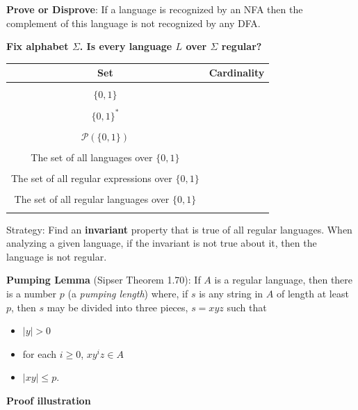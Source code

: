 \documentclass[12pt, oneside]{article}
\begin{document}
\vfill

{\bf Prove or Disprove}: If a language is recognized by an NFA 
then the complement of this language is not recognized by any DFA.

\vfill

\newpage

{\bf Fix alphabet $\Sigma$. Is every language $L$ over $\Sigma$ regular?}

\begin{center}
\begin{tabular}{c|c}
Set & Cardinality \\
\hline
& \\
$\{0,1\}$ & \\
& \\
$\{0,1\}^*$ & \\
& \\
$\mathcal{P}( \{0,1\})$ & \\
& \\
The set of all languages over $\{0,1\}$ & \\
& \\
The set of all regular expressions over $\{0,1\}$ & \\
& \\
The set of all regular languages over $\{0,1\}$ & \\
& \\
\end{tabular}
\end{center}



\vfill
Strategy: Find an {\bf invariant} property that is true of all regular languages. When analyzing 
a given language, if the invariant is not true about it, then the language is not regular.
\newpage

{\bf Pumping Lemma} (Sipser Theorem 1.70): If $A$ is a regular language, then there
is a number $p$ (a {\it pumping length}) where, if $s$ is any string in $A$ of length at least $p$, 
then $s$ may be divided into three pieces, $s = xyz$ such that
\vspace{-10pt}
\begin{itemize}
\item $|y| > 0$
\item for each $i \geq 0$, $xy^i z \in A$
\item $|xy| \leq p$.
\end{itemize}


{\bf Proof illustration}


\vfill
\end{document}

